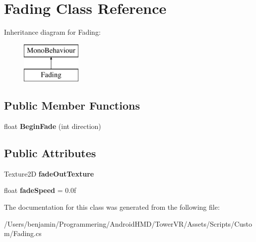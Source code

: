 \hypertarget{class_fading}{}\section{Fading Class Reference}
\label{class_fading}
Inheritance diagram for Fading\+:\begin{figure}[H]
\begin{center}
\leavevmode
\includegraphics[height=2.000000cm]{class_fading}
\end{center}
\end{figure}
\subsection*{Public Member Functions}
\begin{DoxyCompactItemize}
\item 
float {\bfseries Begin\+Fade} (int direction)\hypertarget{class_fading_aad79c9805adb309dfca9c35956a6539f}{}\label{class_fading_aad79c9805adb309dfca9c35956a6539f}

\end{DoxyCompactItemize}
\subsection*{Public Attributes}
\begin{DoxyCompactItemize}
\item 
Texture2D {\bfseries fade\+Out\+Texture}\hypertarget{class_fading_aaba5de61bbf5cd88b53a8d2b81f074a1}{}\label{class_fading_aaba5de61bbf5cd88b53a8d2b81f074a1}

\item 
float {\bfseries fade\+Speed} = 0.\+0f\hypertarget{class_fading_a4850e50beaca24d0a3266221a36f1e5a}{}\label{class_fading_a4850e50beaca24d0a3266221a36f1e5a}

\end{DoxyCompactItemize}


The documentation for this class was generated from the following file\+:\begin{DoxyCompactItemize}
\item 
/\+Users/benjamin/\+Programmering/\+Android\+H\+M\+D/\+Tower\+V\+R/\+Assets/\+Scripts/\+Custom/Fading.\+cs\end{DoxyCompactItemize}
